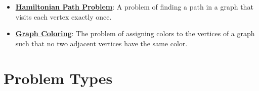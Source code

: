\documentclass{article}%
\begin{document}
\begin{itemize}[leftmargin=*]
\item \href{https://purdue.brightspace.com/d2l/common/assets/pdfjs-d2l-dist/1.0.14-legacy/web/viewer.html?file=%2Fcontent%2Fenforced%2F1095467-wl.202510.CS.24300.001%2F15L2-SAT.pdf%3Fou%3D1095467&lang=en-us&container=d2l-fileviewer-rendered-pdf&fullscreen=d2l-fileviewer-rendered-pdf-dialog&height=667#page=40}{\textbf{Hamiltonian Path Problem}}: A problem of finding a path in a graph that visits each vertex exactly once.%
\item \href{https://purdue.brightspace.com/d2l/common/assets/pdfjs-d2l-dist/1.0.14-legacy/web/viewer.html?file=%2Fcontent%2Fenforced%2F1095467-wl.202510.CS.24300.001%2F15L2-SAT.pdf%3Fou%3D1095467&lang=en-us&container=d2l-fileviewer-rendered-pdf&fullscreen=d2l-fileviewer-rendered-pdf-dialog&height=667#page=47}{\textbf{Graph Coloring}}: The problem of assigning colors to the vertices of a graph such that no two adjacent vertices have the same color.%
\end{itemize}

%
\section{Problem Types}%
\label{sec:ProblemTypes}%
\end{document}
